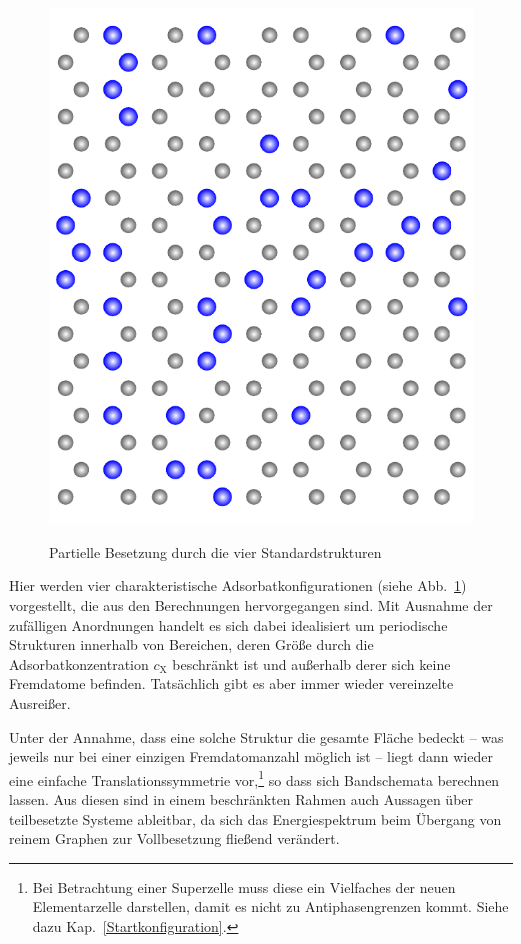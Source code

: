 \documentclass[a4paper, 10pt, twoside, openany]{book} %
\def \cX {c_\mathrm{X}}
\begin{document}
\begin{figure}
\begin{minipage}[b]{0.24\textwidth}
			\includegraphics[width=\textwidth]{Abbildungen/random.pdf}
			\label{ungeordnet}
		\end{minipage}
		\caption{Partielle Besetzung durch die vier Standardstrukturen}
		\label{Standardkonfigurationen}
	\end{figure}
	Hier werden vier charakteristische Adsorbatkonfigurationen (siehe Abb.~\ref{Standardkonfigurationen}) vorgestellt, die aus den Berechnungen hervorgegangen sind. Mit Ausnahme der zufälligen Anordnungen handelt es sich dabei idealisiert um periodische Strukturen innerhalb von Bereichen, deren Größe durch die Adsorbatkonzentration $\cX$ beschränkt ist und außerhalb derer sich keine Fremdatome befinden. Tatsächlich gibt es aber immer wieder vereinzelte Ausreißer.
	
	Unter der Annahme, dass eine solche Struktur die gesamte Fläche bedeckt -- was jeweils nur bei einer einzigen Fremdatomanzahl möglich ist -- liegt dann wieder eine einfache Translationssymmetrie vor,\footnote{Bei Betrachtung einer Superzelle muss diese ein Vielfaches der neuen Elementarzelle darstellen, damit es nicht zu Antiphasengrenzen kommt. Siehe dazu Kap.~\ref{Startkonfiguration}.} so dass sich Bandschemata berechnen lassen. Aus diesen sind in einem beschränkten Rahmen auch Aussagen über teilbesetzte Systeme ableitbar, da sich das Energiespektrum beim Übergang von reinem Graphen zur Vollbesetzung fließend verändert.
	
\end{document}
